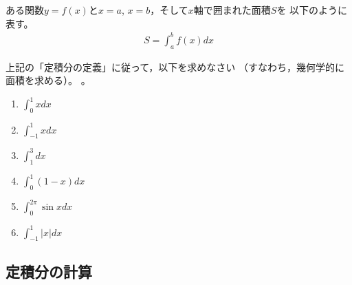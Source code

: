 \documentclass[twocolumn,11pt]{jarticle}
\begin{document}
ある関数$y=f(x)$と$x=a$, $x=b$，そして$x$軸で囲まれた面積$S$を
以下のように表す。
\begin{align}
  \label{eq:integration}
  S=\int_a^bf(x)dx
\end{align}


\nexercise
上記の「定積分の定義」に従って，以下を求めなさい
（すなわち，幾何学的に面積を求める）。
。
\begin{enumerate}
\item\label{iitem:int_0^1xdx} $\displaystyle\int_0^1xdx$
\item\label{iitem:int_-1^1xdx} $\displaystyle\int_{-1}^1xdx$
\item\label{iitem:int_1^3dx} $\displaystyle\int_1^3dx$
\item\label{iitem:int_0^1(1-x)dx} $\displaystyle\int_0^1(1-x)dx$
\item\label{iitem:int_0^2pisinxdx} $\displaystyle\int_0^{2\pi} \sin x dx$
\item\label{iitem:int_-1^1|x|dx} $\displaystyle\int_{-1}^1|x|dx$
\end{enumerate}


\subsection{定積分の計算}
\end{document}
